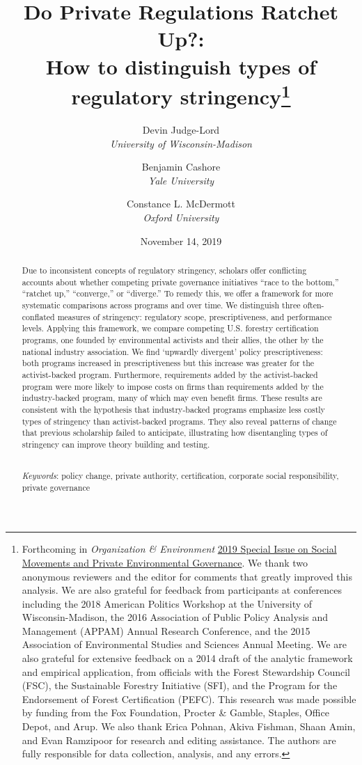 \documentclass[
      12pt,
            Review ]{article}
\title{Do Private Regulations Ratchet Up?: 
           \\ How to distinguish types of regulatory stringency\thanks{Forthcoming in \emph{Organization \& Environment} \href{https://journals.sagepub.com/doi/full/10.1177/1086026619853783}{2019 Special Issue on Social Movements and Private Environmental Governance}. We thank two anonymous reviewers and the editor for comments that greatly improved this analysis. We are also grateful for feedback from participants at conferences including the 2018 American Politics Workshop at the University of Wisconsin-Madison, the 2016 Association of Public Policy Analysis and Management (APPAM) Annual Research Conference, and the 2015 Association of Environmental Studies and Sciences Annual Meeting. We are also grateful for extensive feedback on a 2014 draft of the analytic framework and empirical application, from officials with the Forest Stewardship Council (FSC), the Sustainable Forestry Initiative (SFI), and the Program for the Endorsement of Forest Certification (PEFC). This research was made possible by funding from the Fox Foundation, Procter \& Gamble, Staples, Office Depot, and Arup. We also thank Erica Pohnan, Akiva Fishman, Shaan Amin, and Evan Ramzipoor for research and editing assistance. The authors are fully responsible for data collection, analysis, and any errors.}}
\author{ %
            Devin Judge-Lord  \\ \emph{University of Wisconsin-Madison} 
             \and 
            Benjamin Cashore  \\ \emph{Yale University} 
             \and 
            Constance L. McDermott  \\ \emph{Oxford University} 
            }
\date{November 14, 2019}
\begin{document}
 


  \maketitle




  \begin{abstract}
    \noindent Due to inconsistent concepts of regulatory stringency, scholars offer conflicting accounts about whether competing private governance initiatives ``race to the bottom,'' ``ratchet up,'' ``converge,'' or ``diverge.'' To remedy this, we offer a framework for more systematic comparisons across programs and over time. We distinguish three often-conflated measures of stringency: regulatory scope, prescriptiveness, and performance levels. Applying this framework, we compare competing U.S. forestry certification programs, one founded by environmental activists and their allies, the other by the national industry association. We find `upwardly divergent' policy prescriptiveness: both programs increased in prescriptiveness but this increase was greater for the activist-backed program. Furthermore, requirements added by the activist-backed program were more likely to impose costs on firms than requirements added by the industry-backed program, many of which may even benefit firms. These results are consistent with the hypothesis that industry-backed programs emphasize less costly types of stringency than activist-backed programs. They also reveal patterns of change that previous scholarship failed to anticipate, illustrating how disentangling types of stringency can improve theory building and testing. 

          \hfill \\ 
      \noindent \emph{Keywords}: policy change, private authority, certification, corporate social responsibility, private governance 
    
  \end{abstract}










\noindent 
      \doublespacing 
    \newpage
\end{document}
